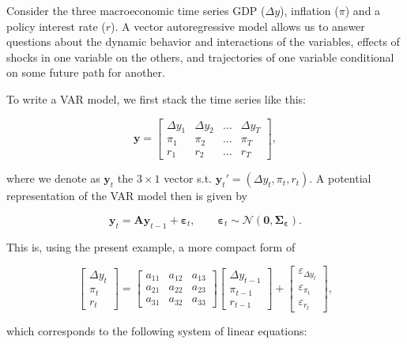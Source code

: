 Consider the three macroeconomic time series GDP ($\Delta y$), inflation ($\pi$) and a policy interest rate ($r$). A vector autoregressive model allows us to answer questions about the dynamic behavior and interactions of the variables, effects of shocks in one variable on the others, and trajectories of one variable conditional on some future path for another.

To write a VAR model, we first stack the time series like this:

\[
	\bm{y}
	=
	\begin{bmatrix}
		\Delta y_1 & \Delta y_2 & \dots & \Delta y_T \\
		\pi_1 & \pi_2 & \dots & \pi_T \\
		r_1 & r_2 & \dots & r_T
	\end{bmatrix}
	,
\]

where we denote as $\bm{y}_t$ the $3\times 1$ vector s.t. $\bm{y}_t' = (\Delta y_t, \pi_t, r_t)$. A potential representation of the VAR model then is given by

\begin{equation}
	\bm{y}_t = \bm{Ay}_{t-1} + \bm{\varepsilon}_t, \qquad \bm{\varepsilon}_t\sim\mathcal{N}(\bm{0},\bm{\Sigma_\varepsilon}).
\end{equation}

This is, using the present example, a more compact form of

\[
	\begin{bmatrix}
		\Delta y_t \\
		\pi_t \\
		r_t
	\end{bmatrix}
	=
	\begin{bmatrix}
		a_{11} & a_{12} & a_{13} \\
		a_{21} & a_{22} & a_{23} \\
		a_{31} & a_{32} & a_{33}
	\end{bmatrix}
	\begin{bmatrix}
		\Delta y_{t-1} \\
		\pi_{t-1} \\
		r_{t-1}
	\end{bmatrix}
	+
	\begin{bmatrix}
		\varepsilon_{\Delta y_t} \\
		\varepsilon_{\pi_t} \\
		\varepsilon_{r_t}
	\end{bmatrix}
	,
\]

which corresponds to the following system of linear equations:

